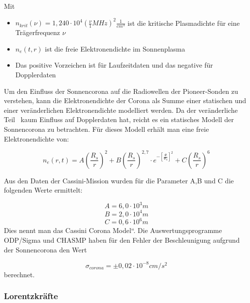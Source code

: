 Mit
\begin{itemize}
\item $n_{\mathit{krit}}(\nu )=1,240\cdot 10^{4}(\frac{\nu
}{1}\mathit{MHz})^{2}\frac{1}{\mathit{cm}^{3}}$ ist die kritische
Plasmadichte f\"ur eine Tr\"agerfrequenz $\nu $

\item $n_{e}(t,r)$ ist die freie Elektronendichte im Sonnenplasma
\item Das positive Vorzeichen ist f\"ur Laufzeitdaten und das negative
f\"ur Dopplerdaten
\end{itemize}

Um den Einfluss der Sonnencorona auf die Radiowellen der
Pioneer-Sonden zu verstehen, kann die Elektronendichte der Corona als
Summe einer statischen und einer ver\"anderlichen Elektronendichte
modelliert werden. Da der ver\"anderliche Teil \ kaum Einfluss auf
Dopplerdaten hat\cite{Anderson2002}, reicht es ein statisches Modell der Sonnencorona
zu betrachten. F\"ur dieses Modell erh\"alt man eine freie
Elektronendichte von\cite{Anderson2002}:

\begin{equation}
n_{e}(r,t)=A(\frac{R_{s}}{r})^{2}+B(\frac{R_{s}}{r})^{2,7}\cdot
e^{-[\frac{\Phi }{\Phi _{0}}]^{2}}+C(\frac{R_{s}}{r})^{6}
\end{equation}

Aus den Daten der Cassini-Mission wurden f\"ur die Parameter A,B und C die
folgenden Werte ermittelt:

\begin{equation*}
A=6,0\cdot 10^{3}m
\end{equation*}
\begin{equation*}
B=2,0\cdot 10^{4}m
\end{equation*}
\begin{equation*}
C=0,6\cdot 10^{6}m
\end{equation*}
Dies nennt man das {\quotedblbase}Cassini Corona Model``. Die
Auswertungsprogramme ODP/Sigma und CHASMP haben f\"ur den Fehler der Beschleunigung aufgrund der Sonnencorona den
Wert

\begin{equation}
\sigma _{\mathit{corona}}=\pm 0,02\cdot
10^{-8}\mathit{cm}/s^{2}
\end{equation}
berechnet\cite{Anderson2002}.


\bigskip

\subsubsection{Lorentzkr\"afte}

